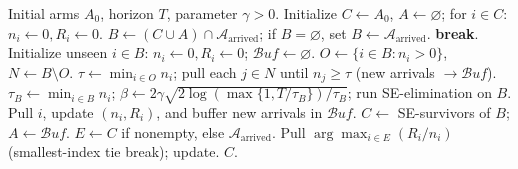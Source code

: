 \documentclass[11pt]{article}
\begin{document}
\begin{algorithm}[htbp]
\caption{\textbf{Dynamic SE}}
\begin{algorithmic}[1]
\Require Initial arms $A_0$, horizon $T$, parameter $\gamma>0$.
\State Initialize $C\gets A_0$, $A\gets\varnothing$; for $i\in C$: $n_i\gets0, R_i\gets0$.
    \State $B\gets (C\cup A)\cap\mathcal{A}_{\mathrm{arrived}}$; if $B=\varnothing$, set $B\gets\mathcal{A}_{\mathrm{arrived}}$.
     \State \textbf{break}. \EndIf
    \State Initialize unseen $i\in B$: $n_i\gets0, R_i\gets0$; $\mathcal{B}uf\gets\varnothing$.
    \State $O\gets\{i\in B:n_i>0\}$, $N\gets B\setminus O$.
        \State $\tau\gets\min_{i\in O}n_i$; pull each $j\in N$ until $n_j\ge\tau$ (new arrivals $\to\mathcal{B}uf$).
        \State $\tau_B\gets\min_{i\in B}n_i$; $\beta\gets2\gamma\sqrt{2\log(\max\{1,T/\tau_B\})/\tau_B}$; run SE-elimination on $B$.
    \EndIf
        \State Pull $i$, update $(n_i,R_i)$, and buffer new arrivals in $\mathcal{B}uf$.
    \EndFor
    \State $C\gets$ SE-survivors of $B$; $A\gets\mathcal{B}uf$.
\EndWhile
\State $E\gets C$ if nonempty, else $\mathcal{A}_{\mathrm{arrived}}$.
    \State Pull $\arg\max_{i\in E}(R_i/n_i)$ (smallest-index tie break); update.
\EndWhile
\State \Return $C$.
\end{algorithmic}
\end{algorithm}
\end{document}
